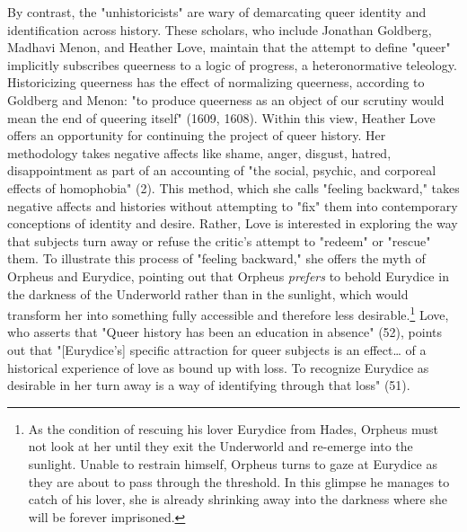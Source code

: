 \documentclass[11pt]{article}
\begin{document}
By contrast, the "unhistoricists" are wary of demarcating queer
identity and identification across history. These scholars, who
include Jonathan Goldberg, Madhavi Menon, and Heather Love, maintain
that the attempt to define "queer" implicitly subscribes queerness to
a logic of progress, a heteronormative teleology. Historicizing
queerness has the effect of normalizing queerness, according to
Goldberg and Menon: "to produce queerness as an object of our scrutiny
would mean the end of queering itself" (1609, 1608). Within this view,
Heather Love offers an opportunity for continuing the project of queer
history. Her methodology takes negative affects like shame, anger,
disgust, hatred, disappointment as part of an accounting of "the
social, psychic, and corporeal effects of homophobia" (2). This
method, which she calls "feeling backward," takes negative affects and
histories without attempting to "fix" them into contemporary
conceptions of identity and desire. Rather, Love is interested in
exploring the way that subjects turn away or refuse the critic's
attempt to "redeem" or "rescue" them. To illustrate this process of
"feeling backward," she offers the myth of Orpheus and Eurydice,
pointing out that Orpheus \emph{prefers} to behold Eurydice in the darkness
of the Underworld rather than in the sunlight, which would transform
her into something fully accessible and therefore less
desirable.\footnote{As the condition of rescuing his lover Eurydice from Hades, Orpheus
must not look at her until they exit the Underworld and re-emerge into
the sunlight. Unable to restrain himself, Orpheus turns to gaze at
Eurydice as they are about to pass through the threshold. In this
glimpse he manages to catch of his lover, she is already shrinking away
into the darkness where she will be forever imprisoned.} Love, who asserts that "Queer history has been an
education in absence" (52), points out that "[Eurydice's] specific
attraction for queer subjects is an effect\ldots{} of a historical
experience of love as bound up with loss. To recognize Eurydice as
desirable in her turn away is a way of identifying through that loss"
(51). 
\end{document}
